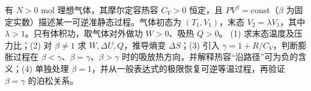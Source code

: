 有 \(N>0\) mol 理想气体，其摩尔定容热容 \(C_V>0\) 恒定，且 \(P V^{\beta}=\mathrm{const}\)（\(\beta\) 为固定实数）描述某一可逆准静态过程。气体初态为 \((T_1,V_1)\)，末态 \(V_2=\lambda V_1\)，其中 \(\lambda>1\)。只有体积功，取气体对外做功 \(W>0\)、吸热 \(Q>0\)。
(1) 求末态温度及压力比；(2) 对 \(\beta\ne1\) 求 \(W,\Delta U,Q\)，推导熵变 \(\Delta S\)；(3) 引入 \(\gamma=1+R/C_V\)，判断膨胀过程在 \(\beta<\gamma\)、\(\beta=\gamma\)、\(\beta>\gamma\) 时的吸放热方向，并解释热容“沿路径”可为负的含义；(4) 单独处理 \(\beta=1\)，并从一般表达式的极限恢复可逆等温过程，再验证 \(\beta=\gamma\) 的泊松关系。
